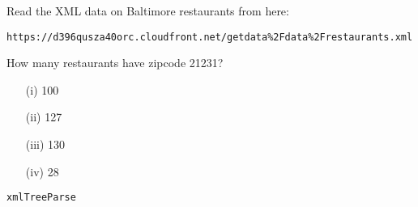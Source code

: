 \documentclass[]{article}
\begin{document}
 
Read the XML data on Baltimore restaurants from here: 

\begin{verbatim}
https://d396qusza40orc.cloudfront.net/getdata%2Fdata%2Frestaurants.xml 
\end{verbatim}
How many restaurants have zipcode 21231? 

\begin{itemize}
\item[(i)] 100 

\item[(ii)] 127 

\item[(iii)] 130 

\item[(iv)] 28
\end{itemize}

\begin{verbatim}
xmlTreeParse
\end{verbatim}
\end{document}

